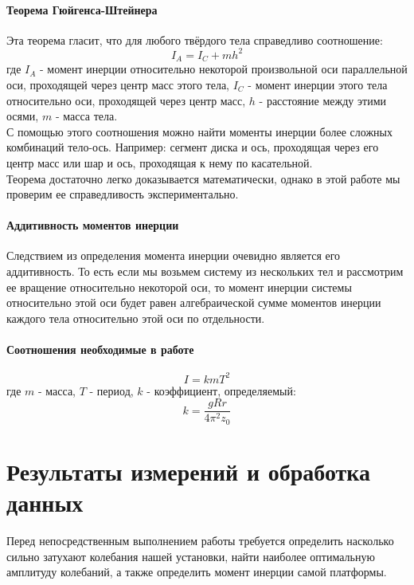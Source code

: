 \documentclass[a4paper,12pt]{article}
\begin{document}
	\paragraph{Теорема Гюйгенса-Штейнера}
	Эта теорема гласит, что для любого твёрдого тела справедливо соотношение:
	\begin{equation}
		I_A=I_C+mh^2
	\end{equation}
	где $I_A$ - момент инерции относительно некоторой произвольной оси параллельной оси, проходящей через центр масс этого тела, $I_C$ - момент инерции этого тела относительно оси, проходящей через центр масс, $h$ - расстояние между этими осями, $m$ - масса тела.\\
	
	С помощью этого соотношения можно найти моменты инерции более сложных комбинаций тело-ось. Например: сегмент диска и ось, проходящая через его центр масс или шар и ось, проходящая к нему по касательной.\\
	
	Теорема достаточно легко доказывается математически, однако в этой работе мы проверим ее справедливость экспериментально.
	
	\paragraph{Аддитивность моментов инерции}
	
	Следствием из определения момента инерции очевидно является его аддитивность. То есть если мы возьмем систему из нескольких тел и рассмотрим ее вращение относительно некоторой оси, то момент инерции системы относительно этой оси будет равен алгебраической сумме моментов инерции каждого тела относительно этой оси по отдельности.
	\newpage
	\paragraph{Соотношения необходимые в работе}
	\begin{equation}
		I=kmT^2
	\end{equation}
	где $m$ - масса, $T$ - период, $k$ - коэффициент, определяемый:
	\begin{equation}
		k=\frac{gRr}{4\pi^2z_0}
	\end{equation}
	
	\section{Результаты измерений и обработка данных}
	Перед непосредственным выполнением работы требуется определить насколько сильно затухают колебания нашей установки, найти наиболее оптимальную амплитуду колебаний, а также определить момент инерции самой платформы.
	
\end{document}
